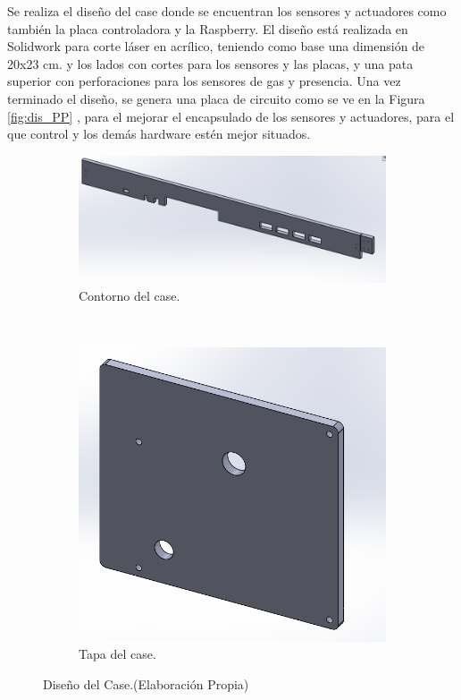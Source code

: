 \documentclass[11pt,letterpaper]{report}
\begin{document}
		Se realiza el diseño del case donde se encuentran los sensores y actuadores como también la placa controladora y la Raspberry. El diseño está realizada en Solidwork para corte láser en acrílico, teniendo como base  una dimensión de 20x23 cm. y los lados con cortes para los sensores y las placas, y una pata superior con perforaciones para los sensores de gas y presencia.
		Una vez terminado el diseño, se genera una placa de circuito como se ve en la Figura \ref{fig:dis_PP} , para el mejorar el encapsulado de los sensores y actuadores, para el que control y los demás hardware estén mejor situados.
	\begin{figure}[ht]
    \centering
    \begin{subfigure}[b]{0.44\textwidth}
        \includegraphics[width=\textwidth]{imagenes/bordes.png}
        \caption{Contorno del case. }
        \label{fig:bordes}
    \end{subfigure}
    ~ %
    \begin{subfigure}[b]{0.44\textwidth}
        \includegraphics[width=\textwidth]{imagenes/tapa_arriba.png}
        \caption{Tapa del case.}
        \label{fig:arriba}
    \end{subfigure}
    \caption{Diseño del Case.(Elaboración Propia)}\label{fig:case}
\end{figure}
		
\end{document}
